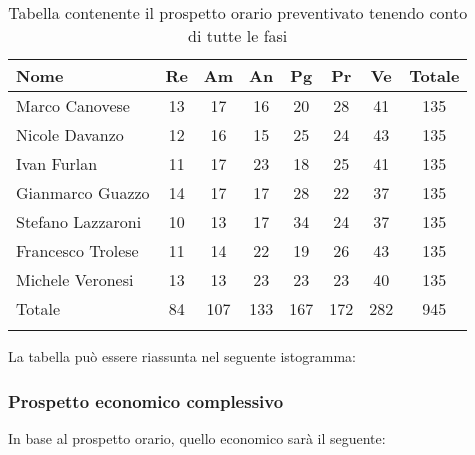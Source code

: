 			\begin{longtable}{|l|c|c|c|c|c|c|c|}
				\hline
				\rowcolor{lighter-grayer}
				\textbf{Nome} & \textbf{Re} & \textbf{Am} & \textbf{An} & \textbf{Pg}  & \textbf{Pr}   & \textbf{Ve} & \textbf{Totale} \\
				\hline
				\endfirsthead
				
				\hline
				Marco Canovese & 13 & 17 & 16 & 20 & 28 & 41 & 135\\
				\hline
				\hline
				Nicole Davanzo & 12 & 16 & 15 & 25 & 24 & 43 & 135\\
				\hline
				\hline
				Ivan Furlan & 11 & 17 & 23 & 18 & 25 & 41 & 135\\
				\hline
				\hline
				Gianmarco Guazzo & 14 & 17 & 17 & 28 & 22 & 37 & 135\\
				\hline
				\hline
				Stefano Lazzaroni & 10 & 13 & 17 & 34 & 24 & 37 & 135\\
				\hline
				\hline
				Francesco Trolese & 11 & 14 & 22 & 19 & 26 & 43 & 135\\
				\hline
				\hline
				Michele Veronesi & 13 & 13 & 23 & 23 & 23 & 40 & 135\\
				\hline 
				\hline
				Totale & 84 & 107 & 133 & 167 & 172 & 282 & 945\\
				\hline 
				\caption{Tabella contenente il prospetto orario preventivato tenendo conto di tutte le fasi}
			\end{longtable}

		
			La tabella può essere riassunta nel seguente istogramma:
		
		
			\subsubsection{Prospetto economico complessivo}
			In base al prospetto orario, quello economico sarà il seguente: 
			
